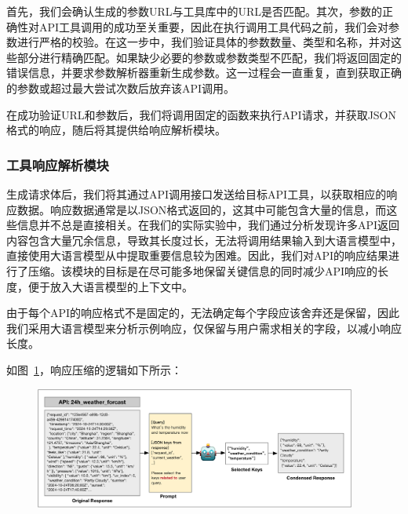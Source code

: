 首先，我们会确认生成的参数URL与工具库中的URL是否匹配。其次，参数的正确性对API工具调用的成功至关重要，因此在执行调用工具代码之前，我们会对参数进行严格的校验。在这一步中，我们验证具体的参数数量、类型和名称，并对这些部分进行精确匹配。如果缺少必要的参数或参数类型不匹配，我们将返回固定的错误信息，并要求参数解析器重新生成参数。这一过程会一直重复，直到获取正确的参数或超过最大尝试次数后放弃该API调用。

在成功验证URL和参数后，我们将调用固定的函数来执行API请求，并获取JSON格式的响应，随后将其提供给响应解析模块。

\subsubsection{工具响应解析模块}

生成请求体后，我们将其通过API调用接口发送给目标API工具，以获取相应的响应数据。响应数据通常是以JSON格式返回的，这其中可能包含大量的信息，而这些信息并不总是直接相关。在我们的实际实验中，我们通过分析发现许多API返回内容包含大量冗余信息，导致其长度过长，无法将调用结果输入到大语言模型中，直接使用大语言模型从中提取重要信息较为困难。因此，我们对API的响应结果进行了压缩。该模块的目标是在尽可能多地保留关键信息的同时减少API响应的长度，便于放入大语言模型的上下文中。

由于每个API的响应格式不是固定的，无法确定每个字段应该舍弃还是保留，因此我们采用大语言模型来分析示例响应，仅保留与用户需求相关的字段，以减小响应长度。

如图~\ref{fig:ch4-compression}，响应压缩的逻辑如下所示：

\begin{figure}[!htp]
  \vspace{1em}
  \centering
  \setlength{\abovecaptionskip}{10pt} %
  \includegraphics[height=4cm]{../assets/ch4-响应压缩.pdf}
  \label{fig:ch4-compression}
\end{figure}

